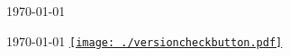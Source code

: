 \documentclass[11pt, a4paper,final]{russell}
\begin{document}
\makecvheader
\makecvfooter
{\today}
{}
{\thepage}

%









\vspace*{\fill}


\makecvfooter
{\today}
{\href{https://DhimanSarkar.github.io/myResume/index.html?pdfVersion=\ifdef{\pdfVersion}{\pdfVersion}{}}{\texttt{[image: ./versioncheckbutton.pdf]}}}
{\thepage}
\end{document}
